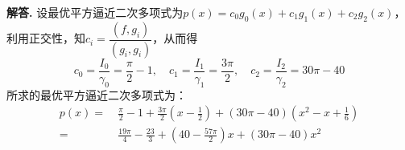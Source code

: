 \documentclass[12pt, a4paper, oneside]{ctexart}
\newenvironment{solution}{\par\noindent\textbf{解答. }}{\bigskip\par}
\begin{document}
\begin{solution}
    设最优平方逼近二次多项式为$p(x)=c_0g_0(x)+c_1g_1(x)+c_2g_2(x)$，利用正交性，知$c_i=\dfrac{(f,g_i)}{(g_i,g_i)}$，从而得
    \begin{equation*}
        c_0 = \frac{I_0}{\gamma_0}=\frac{\pi}{2}-1,\quad c_1 = \frac{I_1}{\gamma_1}=\frac{3\pi}{2},\quad c_2=\frac{I_2}{\gamma_2}=30\pi-40
    \end{equation*}
    所求的最优平方逼近二次多项式为：
    \begin{equation*}
        \begin{aligned}
            p(x) =&\ \frac{\pi}{2}-1+\frac{3\pi}{2}(x-\frac{1}{2})+(30\pi-40)(x^2-x+\frac{1}{6})\\
            =&\ \frac{19\pi}{4}-\frac{23}{3}+(40-\frac{57\pi}{2})x+(30\pi-40)x^2
        \end{aligned}
    \end{equation*}
\end{solution}
\end{document}

